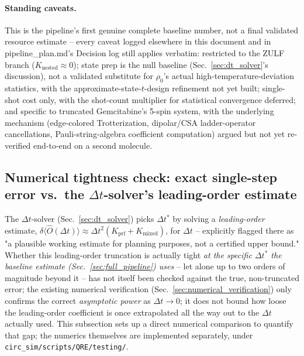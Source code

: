 \documentclass[11pt]{article}
\newcommand{\Dt}{\Delta t}
\begin{document}
\paragraph{Standing caveats.} This is the pipeline's first genuine complete baseline number, not a final validated resource estimate -- every caveat logged elsewhere in this document and in pipeline\_plan.md's Decision log still applies verbatim: restricted to the ZULF branch ($K_{\text{nested}}\approx0$); state prep is the null baseline (Sec.~\ref{sec:dt_solver}'s discussion), not a validated substitute for $\rho_0$'s actual high-temperature-deviation statistics, with the approximate-state-$t$-design refinement not yet built; single-shot cost only, with the shot-count multiplier for statistical convergence deferred; and specific to truncated Gemcitabine's 5-spin system, with the underlying mechanism (edge-colored Trotterization, dipolar/CSA ladder-operator cancellations, Pauli-string-algebra coefficient computation) argued but not yet re-verified end-to-end on a second molecule.

\subsection{Numerical tightness check: exact single-step error vs.\ the \texorpdfstring{$\Dt$}{Dt}-solver's leading-order estimate}
\label{sec:trotter_tightness_check}

The $\Dt$-solver (Sec.~\ref{sec:dt_solver}) picks $\Dt^\ast$ by solving a \emph{leading-order} estimate, $\delta\langle\hat O(\Dt)\rangle\approx\Dt^2(K_{\text{prf}}+K_{\text{mixed}})$, for $\Dt$ -- explicitly flagged there as "a plausible working estimate for planning purposes, not a certified upper bound." Whether this leading-order truncation is actually tight \emph{at the specific $\Dt^\ast$ the baseline estimate (Sec.~\ref{sec:full_pipeline}) uses} -- let alone up to two orders of magnitude beyond it -- has not itself been checked against the true, non-truncated error; the existing numerical verification (Sec.~\ref{sec:numerical_verification}) only confirms the correct \emph{asymptotic power} as $\Dt\to0$; it does not bound how loose the leading-order coefficient is once extrapolated all the way out to the $\Dt$ actually used. This subsection sets up a direct numerical comparison to quantify that gap; the numerics themselves are implemented separately, under \texttt{circ\_sim/scripts/QRE/testing/}.
\end{document}
